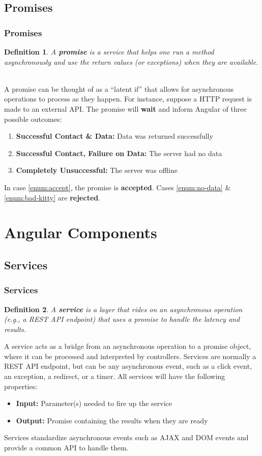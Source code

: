 \documentclass[aspectratio=169]{beamer}
\newtheorem{defn}{Definition}
\begin{document}
\subsection{Promises}
\begin{frame}
\frametitle{Promises}
\begin{defn}
A \textbf{promise} is a service that helps one run a method asynchronously and use the return values (or exceptions) when they are available.
\end{defn}

\mbox{}\\
A promise can be thought of as a ``latent if'' that allows for asynchronous operations to process as they happen. \cite{promise} For instance, suppose a HTTP request is made to an external API. The promise will \textbf{wait} and inform Angular of three possible outcomes:
\begin{enumerate}
	\item \label{enum:accept}\textbf{Successful Contact \& Data:} Data was returned successfully
	\item \label{enum:no-data}\textbf{Successful Contact, Failure on Data:} The server had no data
	\item \label{enum:bad-kitty}\textbf{Completely Unsuccessful:} The server was offline
\end{enumerate}
In case \ref{enum:accept}, the promise is \textbf{accepted}. Cases \ref{enum:no-data} \& \ref{enum:bad-kitty} are \textbf{rejected}.
\end{frame}

\section{Angular Components}
\subsection{Services}
\begin{frame}
\frametitle{Services}
\begin{defn}
A \textbf{service} is a layer that rides on an asynchronous operation (e.g., a REST API endpoint) that uses a promise to handle the latency and results.
\end{defn}

A service acts as a bridge from an asynchronous operation to a promise object, where it can be processed and interpreted by controllers. Services are normally a REST API endpoint, but can be any asynchronous event, such as a click event, an exception, a redirect, or a timer. All services will have the following properties:
\begin{itemize}
	\item \textbf{Input:} Parameter(s) needed to fire up the service
	\item \textbf{Output:} Promise containing the results when they are ready
\end{itemize}

Services standardize asynchronous events such as AJAX and DOM events and provide a common API to handle them.
\end{frame}
\end{document}
